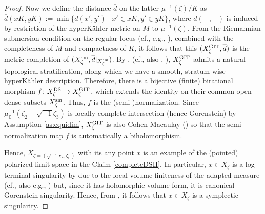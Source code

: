 \documentclass[12pt,a4paper]{amsart}
\theoremstyle{remark}
\theoremstyle{definition}
\def\C{\mathbb{C}}
\begin{document}
\begin{proof}
Now we define the distance $\overline{d}$ on the latter 
$\mu^{-1}(\zeta)/K$ 
as $\overline{d}(xK,yK):=\min\{d(x',y')\mid x'\in xK, y'\in yK\}$, 
where $d(-,-)$ is induced by restriction of the hyperK\"ahler metric on 
$M$ to $\mu^{-1}(\zeta)$. 
From the Riemannian submersion condition on the regular locus 
(cf., e.g., \cite[\S 3A]{HKLR}), combined with 
the completeness of $M$ and 
compactness of $K$, 
it follows that this $(X_\zeta^{\rm GIT},\overline{d})$ 
is the metric completion of  
$(X_\zeta^{\rm sm},\overline{d}|_{X_\zeta^{\rm sm}})$. 
By \cite[Theorem 2.1]{DancerSwann}, \cite[Theorem 1.4, \S 2.5]{May} (cf., 
also \cite{LSj}, \cite[\S 6]{Nakajima}), 
$X_\zeta^{\rm GIT}$ admits a natural topological stratification, along 
which we have a smooth, stratum-wise hyperK\"ahler 
description. 
Therefore, there is a bijective (finite) 
birational morphism 
$f\colon X_\zeta^{\rm DS}\to X_\zeta^{\rm GIT}$, 
which extends the identity on their common 
open dense subsets $X_\zeta^{\rm sm}$. Thus, $f$ is the 
(semi-)normalization. Since 
$\mu_\C^{-1}(\zeta_2+\sqrt{-1}\zeta_3)$ is locally complete intersection 
(hence Gorenstein) by Assumption \ref{as:equidim}, 
$X_\zeta^{\rm GIT}$ is also Cohen-Macaulay (\cite{HR}) so that 
the semi-normalization map 
$f$ is automatically a biholomorphism. 

Hence, 
$X_{\zeta=(\sqrt{-1}\chi_*,\zeta_\C)}$ with its any point $x$ 
is an example of the (pointed) polarized limit space in the 
Claim \ref{completeDSII}. 
In particular, $x\in X_\zeta$ is a 
log terminal singularity 
by \cite{DSII} due to the local volume finiteness of the 
adapted measure (cf., also e.g., \cite{EGZ}) 
but, since it has holomorphic volume form, 
it is canonical Gorenstein singularity. Hence, 
from \cite[Theorem 4]{Nam.ex}, it follows that 
$x\in X_\zeta$ is a symplectic singularity. 


\end{proof}
\end{document}
